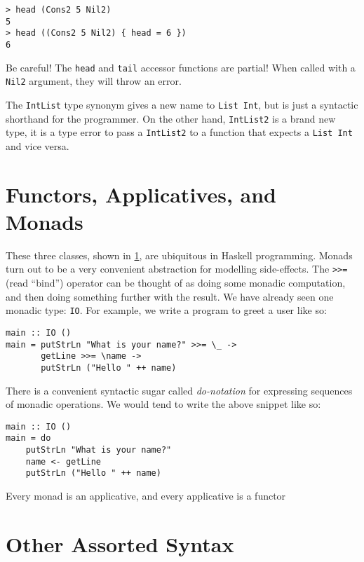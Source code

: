\begin{verbatim}
> head (Cons2 5 Nil2)
5
> head ((Cons2 5 Nil2) { head = 6 })
6
\end{verbatim}

Be careful!  The \verb|head| and \verb|tail| accessor functions are partial!
When called with a \verb|Nil2| argument, they will throw an error.

\begin{figure}[b]
  \hrulefill
  \centering
  
  \label{fig:famonad}
\end{figure}

The \verb|IntList| type synonym gives a new name to \verb|List Int|, but is just
a syntactic shorthand for the programmer.  On the other hand, \verb|IntList2| is
a brand new type, it is a type error to pass a \verb|IntList2| to a function
that expects a \verb|List Int| and vice versa.

\section*{Functors, Applicatives, and Monads}

These three classes, shown in \cref{fig:famonad}, are ubiquitous in Haskell
programming.  Monads turn out to be a very convenient abstraction for modelling
side-effects.  The \verb|>>=| (read ``bind'') operator can be thought of as
doing some monadic computation, and then doing something further with the
result.  We have already seen one monadic type: \verb|IO|.  For example, we
write a program to greet a user like so:

\begin{verbatim}
main :: IO ()
main = putStrLn "What is your name?" >>= \_ ->
       getLine >>= \name ->
       putStrLn ("Hello " ++ name)
\end{verbatim}

There is a convenient syntactic sugar called \emph{do-notation} for expressing
sequences of monadic operations.  We would tend to write the above snippet like
so:

\begin{verbatim}
main :: IO ()
main = do
    putStrLn "What is your name?"
    name <- getLine
    putStrLn ("Hello " ++ name)
\end{verbatim}

Every monad is an applicative, and every applicative is a functor

\section*{Other Assorted Syntax}

